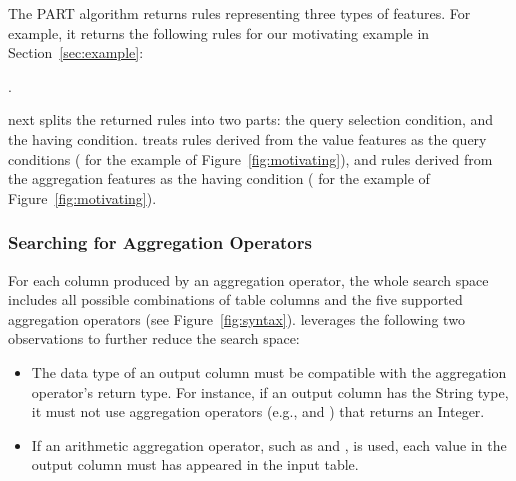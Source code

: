 The PART algorithm returns rules representing three types of features.
For example, it returns the following rules for our motivating example in Section~\ref{sec:example}:

\smallskip
{
}

.

\ourtool next splits the returned rules into two parts: the query selection
condition, and the having condition. 
\ourtool treats rules derived from the value features
as the query conditions (
for the example of Figure~\ref{fig:motivating}),
and rules derived from
the aggregation features as the having condition (
for the example of Figure~\ref{fig:motivating}). 




\subsubsection{Searching for Aggregation Operators}
\label{sec:agg_search}

For each column produced by an aggregation operator,
the whole search space includes all possible combinations
of table columns and the five supported aggregation operators (see Figure~\ref{fig:syntax}).
\ourtool leverages the following two observations to
further reduce the search space:

\begin{itemize}
\item The data type of an output column must be compatible with the
aggregation operator's return type. For instance, if an output column
has the String type, it must not use aggregation operators (e.g.,
 and ) that returns
an Integer. 

\item If an arithmetic aggregation operator, such as  and ,
is used, each value in the output column must has appeared in the input table.
\end{itemize}


